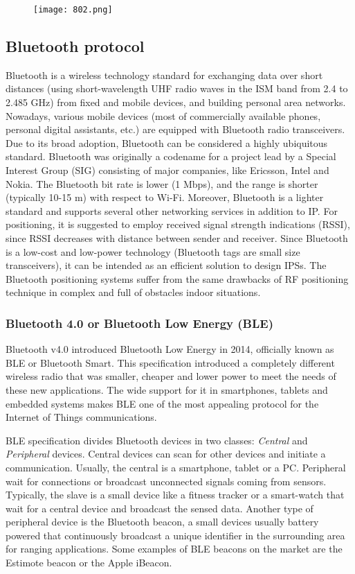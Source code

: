 \begin{figure}[h!tb]
\centering\texttt{[image: 802.png]}
\caption{}
\label{fig:802}
\end{figure}

\subsection{Bluetooth protocol}
Bluetooth is a wireless technology standard for exchanging data over short distances (using short-wavelength UHF radio waves in the ISM band from 2.4 to 2.485 GHz) from fixed and mobile devices, and building personal area networks.
Nowadays, various mobile devices (most of commercially available phones, personal digital assistants, etc.) are equipped with Bluetooth radio transceivers. Due to its broad adoption, Bluetooth can be considered a highly ubiquitous standard. Bluetooth was originally a codename for a project lead by a Special Interest Group (SIG) consisting of major companies, like Ericsson, Intel and Nokia. The Bluetooth bit rate is lower (1 Mbps), and the range is shorter (typically
10-15 m) with respect to Wi-Fi. Moreover, Bluetooth is a lighter standard and supports several other networking services in addition to IP. For positioning, it is suggested to employ received signal strength indications (RSSI), since RSSI decreases with distance between sender and receiver. Since Bluetooth is a low-cost and low-power technology (Bluetooth tags are small size transceivers), it can be intended as an efficient solution to design IPSs. The Bluetooth positioning systems suffer from the same drawbacks of RF positioning technique in complex and full of obstacles indoor situations.


\subsubsection{Bluetooth 4.0 or Bluetooth Low Energy (BLE)}
\label{subsec:BLEprotocol}

Bluetooth v4.0 introduced Bluetooth Low Energy in 2014, officially known as BLE or Bluetooth Smart. This specification introduced a completely different wireless radio that was smaller, cheaper and lower power to meet the needs of these new applications. The wide support for it in smartphones, tablets and embedded systems makes BLE one of the most appealing protocol for the Internet of Things communications.

\smallskip
BLE specification divides Bluetooth devices in two classes: \emph{Central} and \emph{Peripheral} devices. Central devices can scan for other devices and initiate a communication. Usually, the central is a smartphone, tablet or a PC.
Peripheral wait for connections or broadcast unconnected signals coming from sensors. Typically, the slave is a small device like a fitness tracker or a smart-watch that wait for a central device and broadcast the sensed data.
Another type of peripheral device is the Bluetooth beacon, a small devices usually battery powered that continuously broadcast a unique identifier in the surrounding area for ranging applications. Some examples of BLE beacons on the market are the Estimote beacon or the Apple iBeacon.

